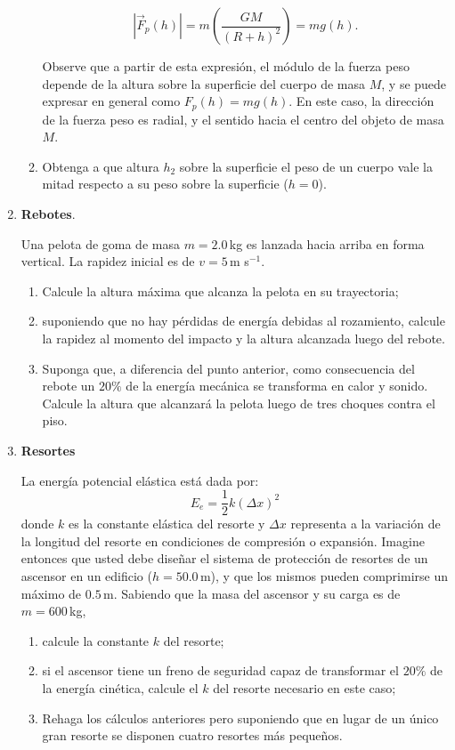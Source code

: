 \documentclass[a4paper,12pt]{article}
\begin{document}
\begin{enumerate}
\begin{enumerate}
    \[ |\vec F_p(h)| = m \left ( \frac{G M}{(R + h)^2} \right ) = m g(h). \]

    Observe que a partir de esta expresión, el módulo de la fuerza peso depende de la altura sobre la superficie del cuerpo de masa $M$, y se puede expresar en general como $F_p(h) = m g(h)$. En este caso, la dirección de la fuerza peso es radial, y el sentido hacia el centro del objeto de masa $M$.
  \item Obtenga a que altura $h_2$ sobre la superficie el peso de un cuerpo vale la mitad respecto a su peso sobre la superficie ($h=0$).
  \end{enumerate}

\item {\bf{Rebotes}}.

Una pelota de goma de masa $m=2.0$\,kg es lanzada hacia arriba en forma vertical. La rapidez inicial es de $v=5$\,m s$^{-1}$.
\begin{enumerate}
\item Calcule la altura máxima que alcanza la pelota en su trayectoria; 
\item suponiendo que no hay pérdidas de energía debidas al rozamiento, calcule la rapidez al momento del impacto y la altura alcanzada luego del rebote. 
\item Suponga que, a diferencia del punto anterior, como consecuencia del rebote un $20\%$ de la energía mecánica se transforma en calor y sonido. Calcule la altura que alcanzará la pelota luego de tres choques contra el piso.
\end{enumerate}

\item{\bf{Resortes}}

La energía potencial elástica está dada por:
\[E_e = \frac{1}{2} k (\Delta x)^2 \]
donde $k$ es la constante elástica del resorte y $\Delta x$ representa a la variación de la longitud del resorte en condiciones de compresión o expansión. Imagine entonces que usted debe diseñar el sistema de protección de resortes de un ascensor en un edificio ($h=50.0$\,m), y que los mismos pueden comprimirse un máximo de $0.5$\,m. Sabiendo que la masa del ascensor y su carga es de $m=600$\,kg,

\begin{enumerate}
\item calcule la constante $k$ del resorte;
\item si el ascensor tiene un freno de seguridad capaz de transformar el $20\%$ de la energía cinética, calcule el $k$ del resorte necesario en este caso;
\item Rehaga los cálculos anteriores pero suponiendo que en lugar de un único gran resorte se disponen cuatro resortes más pequeños.
\end{enumerate}


\end{enumerate}
\end{document}
